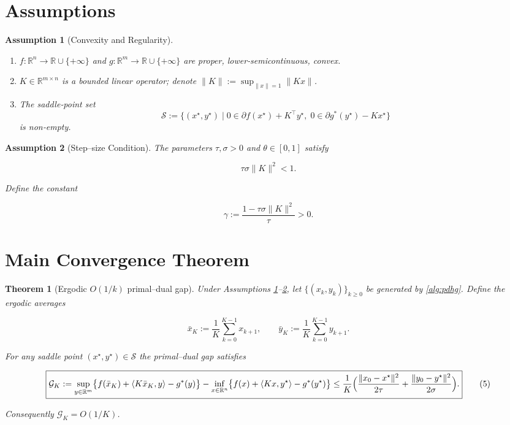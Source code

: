 \documentclass{article}
\newtheorem{theorem}{Theorem}
\newtheorem{assumption}{Assumption}
\begin{document}
\newpage
\section*{Assumptions}
\begin{assumption}[Convexity and Regularity]\label{as:convex}
\begin{enumerate}[label=(\alph*)]
\item $f:\mathbb R^{n}\to\mathbb R\cup\{+\infty\}$ and $g:\mathbb R^{m}\to\mathbb R\cup\{+\infty\}$ are proper, lower‑semicontinuous, convex.
\item $K\in\mathbb R^{m\times n}$ is a bounded linear operator; denote $\|K\|:=\sup_{\|x\|=1}\|Kx\|$.
\item The saddle‑point set 
\[
\mathcal S:=\{(x^{\star},y^{\star})\mid 0\in\partial f(x^{\star})+K^{\top}y^{\star},
\;0\in\partial g^{*}(y^{\star})-Kx^{\star}\}
\]
is non‑empty.
\end{enumerate}
\end{assumption}

\begin{assumption}[Step–size Condition]\label{as:steps}
The parameters $\tau,\sigma>0$ and $\theta\in[0,1]$ satisfy  

\[
\tau\sigma\|K\|^{2}<1.
\tag{3}
\]

Define the constant  

\[
\gamma:=\frac{1-\tau\sigma\|K\|^{2}}{\tau}>0.
\tag{4}
\]
\end{assumption}

\section*{Main Convergence Theorem}
\begin{theorem}[Ergodic $O(1/k)$ primal–dual gap]\label{thm:rate}
Under Assumptions \ref{as:convex}–\ref{as:steps}, let $\{(x_{k},y_{k})\}_{k\ge0}$ be generated by \eqref{alg:pdhg}.  
Define the ergodic averages  

\[
\bar x_{K}:=\frac{1}{K}\sum_{k=0}^{K-1}x_{k+1},
\qquad
\bar y_{K}:=\frac{1}{K}\sum_{k=0}^{K-1}y_{k+1}.
\]

For any saddle point $(x^{\star},y^{\star})\in\mathcal S$ the primal–dual gap satisfies  

\[
\boxed{
\mathcal G_{K}:=
\sup_{y\in\mathbb R^{m}}\bigl\{f(\bar x_{K})+\langle K\bar x_{K},y\rangle-g^{*}(y)\bigr\}
-
\inf_{x\in\mathbb R^{n}}\bigl\{f(x)+\langle Kx,y^{\star}\rangle-g^{*}(y^{\star})\bigr\}
\le
\frac{1}{K}\Bigl(\frac{\|x_{0}-x^{\star}\|^{2}}{2\tau}
+\frac{\|y_{0}-y^{\star}\|^{2}}{2\sigma}\Bigr).
}
\tag{5}
\]

Consequently $\mathcal G_{K}=O(1/K)$.
\end{theorem}
\end{document}

